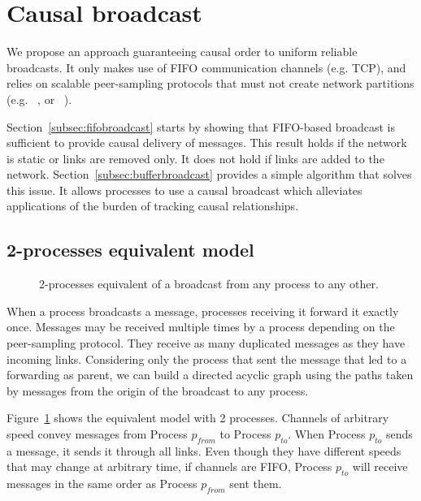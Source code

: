 
\section{Causal broadcast}
\label{sec:proposal}

We propose an approach guaranteeing causal order to uniform reliable
broadcasts. It only makes use of FIFO communication channels (e.g. TCP), and
relies on scalable peer-sampling protocols that must not create network
partitions (e.g. \SPRAY~\cite{nedelec2017adaptive}, or
\CYCLON~\cite{voulgaris2005cyclon}).

Section~\ref{subsec:fifobroadcast} starts by showing that FIFO-based broadcast
is sufficient to provide causal delivery of messages. This result holds if the
network is static or links are removed only. It does not hold if links are added
to the network. Section~\ref{subsec:bufferbroadcast} provides a simple algorithm
that solves this issue. It allows processes to use a causal broadcast which
alleviates applications of the burden of tracking causal relationships.

\subsection{2-processes equivalent model}

\begin{figure}
  \begin{center}
    
    \caption{\label{fig:2eqmodel}2-processes equivalent of a broadcast from any
      process to any other.}
    \end{center}
\end{figure}


When a process broadcasts a message, processes receiving it forward it exactly
once. Messages may be received multiple times by a process depending on the
peer-sampling protocol. They receive as many duplicated messages as they have
incoming links.  Considering only the process that sent the message that led to
a forwarding as parent, we can build a directed acyclic graph using the paths
taken by messages from the origin of the broadcast to any process.

Figure~\ref{fig:2eqmodel} shows the equivalent model with 2 processes. Channels
of arbitrary speed convey messages from Process $p_{from}$ to Process
$p_{to}$. When Process $p_{to}$ sends a message, it sends it through all
links. Even though they have different speeds that may change at arbitrary time,
if channels are FIFO, Process $p_{to}$ will receive messages in the same order as
Process $p_{from}$ sent them.


